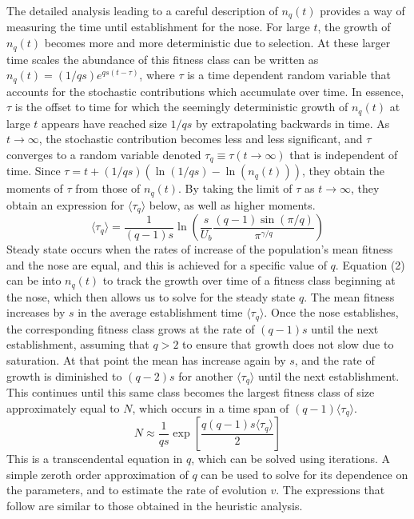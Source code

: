 \documentclass[12pt, one column]{article}
\begin{document}
The detailed analysis leading to a careful description of $n_q(t)$ provides a way of measuring the time until establishment for the nose.  For large $t$, the growth of $n_q(t)$ becomes more and more deterministic due to selection.  At these larger time scales the abundance of this fitness class can be written as $n_q(t) = (1/qs) e^{qs(t-\tau)}$, where $\tau$ is a time dependent random variable that accounts for the stochastic contributions which accumulate over time.  In essence, $\tau$ is the offset to time for which the seemingly deterministic growth of $n_q(t)$ at large $t$ appears have reached size $1/qs$ by extrapolating backwards in time.  As $t\rightarrow \infty$, the stochastic contribution becomes less and less significant, and $\tau$ converges to a random variable denoted $\tau_q \equiv \tau (t\rightarrow \infty)$ that is independent of time.  Since $\tau = t +(1/qs)(\ln(1/qs)-\ln(n_q(t)))$, they obtain the moments of $\tau$ from those of $n_q(t)$.  By taking the limit of $\tau$ as $t\rightarrow \infty$, they obtain an expression for $\langle \tau_q \rangle$ below, as well as higher moments. 
\begin{equation} 
\langle \tau_q \rangle = \frac{1}{(q-1)s}\ln\left(\frac{s}{U_b}\frac{(q-1)\sin(\pi/q)}{\pi^{\gamma/q}}\right)
\end{equation}
Steady state occurs when the rates of increase of the population's mean fitness and the nose are equal, and this is achieved for a specific value of $q$.  Equation (2) can be into $n_q(t)$ to track the growth over time of a fitness class beginning at the nose, which then allows us to solve for the steady state $q$.  The mean fitness increases by $s$ in the average establishment time $\langle \tau_q \rangle$.  Once the nose establishes, the corresponding fitness class grows at the rate of $(q-1)s$ until the next establishment, assuming that $q>2$ to ensure that growth does not slow due to saturation.  At that point the mean has increase again by $s$, and the rate of growth is diminished to $(q-2)s$ for another $\langle \tau_q \rangle$ until the next establishment.  This continues until this same class becomes the largest fitness class of size approximately equal to $N$, which occurs in a time span of $(q-1) \langle \tau_q \rangle$.
\begin{equation}
N \approx  \frac{1}{qs} \exp\left[ \frac{q(q-1)s \langle \tau_q \rangle}{2}\right]  
\end{equation}
This is a transcendental equation in $q$, which can be solved using iterations.  A simple zeroth order approximation of $q$ can be used to solve for its dependence on the parameters, and to estimate the rate of evolution $v$. The expressions that follow are similar to those obtained in the heuristic analysis.
\end{document}
